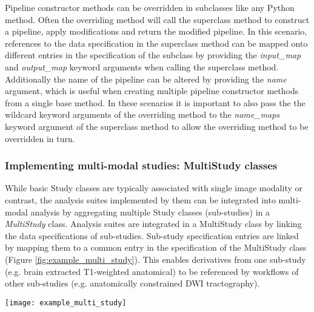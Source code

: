 \documentclass[smallextended]{svjour3}       %
\begin{document}
Pipeline constructor methods can be overridden in subclasses like any Python
method. Often the overriding method will call the superclass method
to construct a pipeline, apply modifications and return the
modified pipeline. In this scenario, references to the data
specification in the superclass method can be mapped onto different
entries in the specification of the subclass by providing the \emph{input\_map} and
\emph{output\_map} keyword arguments when calling the superclass method.
Additionally the name of the pipeline can be altered by providing the \emph{name}
argument, which is useful when creating multiple pipeline constructor methods
from a single base method. In these scenarios it is important to
also pass the the wildcard keyword arguments of the overriding method to the
\emph{name\_maps} keyword argument of the superclass method to allow the
overriding method to be overridden in turn.


\subsubsection*{Implementing multi-modal studies: MultiStudy classes}
\label{implementing-multi-modal-studies}

While basic Study classes are typically associated with single image
modality or contrast, the analysis suites implemented by them can be
integrated into multi-modal analysis by aggregating multiple Study
classes (sub-studies) in a \emph{MultiStudy} class. Analysis suites are
integrated in a MultiStudy class by linking the data specifications
of sub-studies. Sub-study specification entries are linked by mapping
them to a common entry in the specification of the MultiStudy class
(Figure \ref{fig:example_multi_study}). This enables derivatives from one
sub-study (e.g. brain extracted T1-weighted anatomical) to be referenced
by workflows of other sub-studies (e.g. anatomically constrained DWI
tractography).


\begin{figure*}
  \centering
    \texttt{[image: example\_multi\_study]}
  \caption{Example MultiStudy. Blue boxes represent input data
(filesets or fields) and green derivatives. Orange ovals
are pipelines. Blue and green arrows: pipeline inputs from study inputs
and derived data, respectively. Orange arrows: outputs of pipelines. Dashed
boxes represent data specifications in a sub-study that are present in
the global namespace and mapped into the sub-study space, and dotted
arrows the mappings. Sub-studies are linked by mapping the same data
spec in the global space onto data specifications the multiple sub-study
namespaces (e.g. \emph{Derived} \emph{1}, \emph{2} and \emph{3}).
There are no restrictions between mapping study input and derivative data
specifications: both input and derivative specifications can be mapped
onto input data or derivative specifications in sub-studies.
If a spec in the global spaced is mapped onto a derivative spec in the
sub-study space, then the pipeline that generates that derivative in the
sub-study will not run unless it generates other required derivatives
(e.g. \emph{Pipeline 3} in \emph{Sub-Study 2})}
\label{fig:example_multi_study}
\end{figure*}
\end{document}
